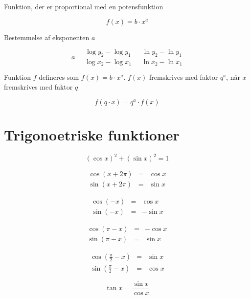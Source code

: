 \documentclass[11pt,a4paper,landscape,twocolumn,fleqn,leqno]{article}
\begin{document}
Funktion, der er proportional med en potensfunktion

\begin{equation}
f(x) = b \cdot x^a
\end{equation}

Bestemmelse af eksponenten $a$

\begin{equation}
a = \frac{\log y_2 - \log y_1}{\log x_2 - \log x_1} = \frac{\ln y_2 - \ln y_1}{\ln x_2 - \ln x_1}
\end{equation}

Funktion $f$ defineres som $f(x) = b \cdot x^a$. $f(x)$ fremskrives med faktor $q^a$, når $x$ fremskrives med faktor $q$

\begin{equation}
f(q \cdot x) = q^a \cdot f(x)
\end{equation}

\vfill

\section{Trigonoetriske funktioner}

\begin{equation}
(\cos x)^2 + (\sin x)^2 = 1
\end{equation}

\begin{eqnarray}
\cos(x + 2\pi) & = & \cos x \\
\sin(x + 2\pi) & = & \sin x \nonumber
\end{eqnarray}

\begin{eqnarray}
\cos(-x) & = & \cos x \\
\sin(-x) & = & - \sin x \nonumber
\end{eqnarray}

\begin{eqnarray}
\cos(\pi - x) & = & - \cos x \\
\sin(\pi - x) & = & \sin x \nonumber
\end{eqnarray}

\begin{eqnarray}
\cos\left(\frac{\pi}{2}-x\right) & = & \sin x \\
\sin\left(\frac{\pi}{2}-x\right) & = & \cos x \nonumber
\end{eqnarray}

\begin{equation}
\tan x = \frac{\sin x}{\cos x}
\end{equation}
\end{document}
